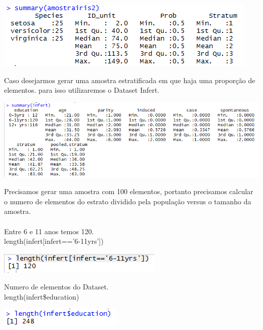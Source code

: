 {\centering \includegraphics[scale=1.0]{cap1/Amostragem/amostragemEstratificadaR2.png} \par}

\newpage

Caso desejarmos gerar uma amostra estratificada em que haja uma proporção de elementos. 
para isso utilizaremos o Dataset Infert.\\

{\centering \includegraphics[scale=0.7]{cap1/Amostragem/amostragemEstratificadaR2Infert.png} \par}

Precisamos gerar uma amostra com 100 elementos, portanto precisamos calcular o numero de elementos do estrato dividido pela população versus o tamanho da amostra.
\\\\
Entre 6 e 11 anos temos 120.
\\
length(infert[infert=='6-11yrs'])\\

{\centering \includegraphics[scale=1.0]{cap1/Amostragem/amostragemEstratificadaR2Infert2.png} \par}


Numero de elementos do Dataset.
\\
length(infert\$education)\\

{\centering \includegraphics[scale=1.0]{cap1/Amostragem/amostragemEstratificadaR2Infert3.png} \par}

